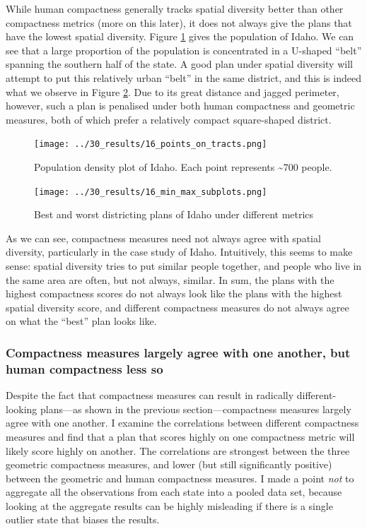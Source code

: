 \documentclass[]{article}
\begin{document}
While human compactness generally tracks spatial diversity better than
other compactness metrics (more on this later), it does not always give
the plans that have the lowest spatial diversity. Figure
\ref{idaho_density} gives the population of Idaho. We can see that a
large proportion of the population is concentrated in a U-shaped
``belt'' spanning the southern half of the state. A good plan under
spatial diversity will attempt to put this relatively urban ``belt'' in
the same district, and this is indeed what we observe in Figure
\ref{idaho_minmax}. Due to its great distance and jagged perimeter,
however, such a plan is penalised under both human compactness and
geometric measures, both of which prefer a relatively compact
square-shaped district.

\begin{figure}
\centering
\texttt{[image: ../30\_results/16\_points\_on\_tracts.png]}
\caption{Population density plot of Idaho. Each point represents
\textasciitilde{}700 people. \label{idaho_density}}
\end{figure}

\begin{figure}
\centering
\texttt{[image: ../30\_results/16\_min\_max\_subplots.png]}
\caption{Best and worst districting plans of Idaho under different
metrics \label{idaho_minmax}}
\end{figure}

As we can see, compactness measures need not always agree with spatial
diversity, particularly in the case study of Idaho. Intuitively, this
seems to make sense: spatial diversity tries to put similar people
together, and people who live in the same area are often, but not
always, similar. In sum, the plans with the highest compactness scores
do not always look like the plans with the highest spatial diversity
score, and different compactness measures do not always agree on what
the ``best'' plan looks like.

\hypertarget{compactness-measures-largely-agree-with-one-another-but-human-compactness-less-so}{%
\subsubsection{Compactness measures largely agree with one another, but
human compactness less
so}\label{compactness-measures-largely-agree-with-one-another-but-human-compactness-less-so}}

Despite the fact that compactness measures can result in radically
different-looking plans---as shown in the previous section---compactness
measures largely agree with one another. I examine the correlations
between different compactness measures and find that a plan that scores
highly on one compactness metric will likely score highly on another.
The correlations are strongest between the three geometric compactness
measures, and lower (but still significantly positive) between the
geometric and human compactness measures. I made a point \emph{not} to
aggregate all the observations from each state into a pooled data set,
because looking at the aggregate results can be highly misleading if
there is a single outlier state that biases the results.
\end{document}
